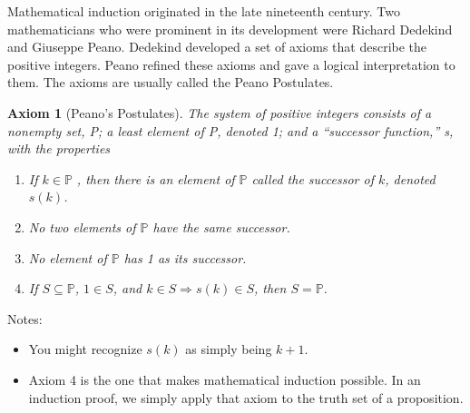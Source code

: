 \documentclass[10pt,]{book}
\theoremstyle{plain}
\newtheorem{axiom}[theorem]{Axiom}
\theoremstyle{definition}
\theoremstyle{definition}
\theoremstyle{definition}
\theoremstyle{definition}
\begin{document}
\par
Mathematical induction originated in the late nineteenth century. Two mathematicians who were prominent in its development were Richard Dedekind and Giuseppe Peano. Dedekind developed a set of axioms that describe the positive integers. Peano refined these axioms and gave a logical interpretation to them. The axioms are usually called the Peano Postulates.%
\begin{axiom}[Peano's Postulates}]\label{sss-peano-postulates}
 The system of positive integers consists of a nonempty set, P; a least element of P, denoted 1; and a
``successor function,'' s, with the properties%
\par
\leavevmode%
\begin{enumerate}[label=\arabic*]
\item\hypertarget{li-269}{} If \(k \in  \mathbb{P}\) , then there is an element of \(\mathbb{P}\) called the successor of \(k\), denoted \(s(k)\).%
\item\hypertarget{li-270}{}  No two elements of \(\mathbb{P}\) have the same successor.%
\item\hypertarget{li-271}{}  No element of \(\mathbb{P}\) has 1 as its successor.%
\item\hypertarget{li-272}{} If \(S \subseteq  \mathbb{P}\), \(1 \in  S\), and \(k \in S \Rightarrow  s(k) \in  S\), then \(S = \mathbb{P}\).%
\end{enumerate}

%
\end{axiom}
\par
Notes:
\leavevmode%
\begin{itemize}[label=\textbullet]
\item{} You might recognize \(s(k)\) as simply being \(k + 1\).%
\item{} Axiom 4 is the one that makes mathematical induction possible. In an induction proof, we simply apply that axiom to the truth set of a proposition.%
\end{itemize}
%
\typeout{************************************************}
\typeout{************************************************}
\end{document}
